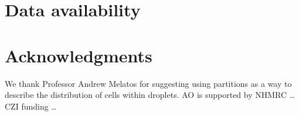 \documentclass[unnumsec,webpdf,modern,large]{oup-authoring-template}
\begin{document}
	
	
	\section{Data availability}
	\label{sec:data availability}
	
	
	
	\section{Acknowledgments}
	\label{acknowledgements}
	
	We thank Professor Andrew Melatos for suggesting using partitions as a way to describe the distribution of cells within droplets. AO is supported by NHMRC … CZI funding …	
	
	
	 
	
	
	
	
	
\end{document}
